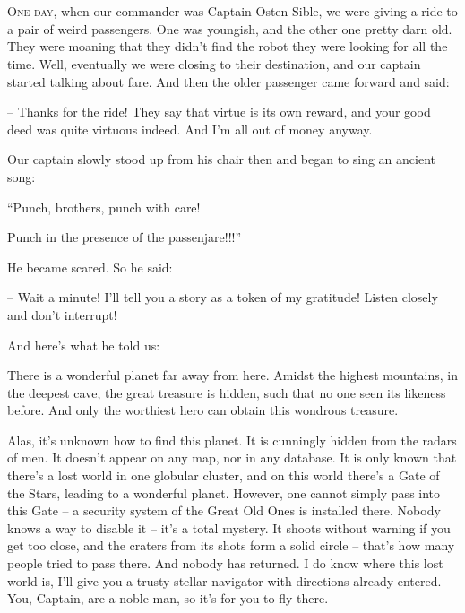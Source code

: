 \documentclass[ebook,oneside,final,openright]{memoir}
\begin{document}
\chapter{}
\par
\lettrine{O}{ne day,} when our commander was Captain Osten Sible, we were giving a ride to a pair of weird passengers. One was youngish, and the other one pretty darn old. They were moaning that they didn’t find the robot they were looking for all the time. Well, eventually we were closing to their destination, and our captain started talking about fare. And then the older passenger came forward and said: \par
\par
– Thanks for the ride! They say that virtue is its own reward, and your good deed was quite virtuous indeed. And I’m all out of money anyway.\par
Our captain slowly stood up from his chair then and began to sing an ancient song: \par
“Punch, brothers, punch with care! \par
 Punch in the presence of the passenjare!!!” \par
He became scared. So he said:\par
– Wait a minute! I’ll tell you a story as a token of my gratitude! Listen closely and don’t interrupt! \par
 And here’s what he told us:\par
\par
 There is a wonderful planet far away from here. Amidst the highest mountains, in the deepest cave, the great treasure is hidden, such that no one seen its likeness before. And only the worthiest hero can obtain this wondrous treasure. \par
Alas, it’s unknown how to find this planet. It is cunningly hidden from the radars of men. It doesn’t appear on any map, nor in any database. It is only known that there’s a lost world in one globular cluster, and on this world there’s a Gate of the Stars, leading to a wonderful planet. However, one cannot simply pass into this Gate – a security system of the Great Old Ones is installed there. Nobody knows a way to disable it – it’s a total mystery. It shoots without warning if you get too close, and the craters from its shots form a solid circle – that’s how many people tried to pass there. And nobody has returned. I do know where this lost world is, I’ll give you a trusty stellar navigator with directions already entered. You, Captain, are a noble man, so it’s for you to fly there.\par
\end{document}
